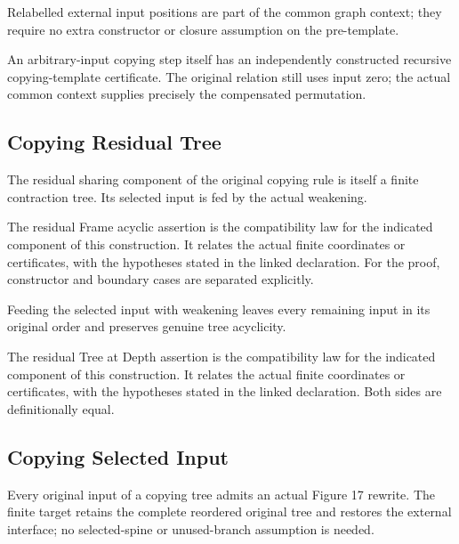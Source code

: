 Relabelled external input positions are part of the common graph context; they require no extra constructor or closure assumption on the pre-template.
\par{}

An arbitrary-input copying step itself has an independently constructed recursive copying-template certificate. The original relation still uses input zero; the actual common context supplies precisely the compensated permutation.
\par{}

\subsection{Copying Residual Tree}
The residual sharing component of the original copying rule is itself a finite contraction tree. Its selected input is fed by the actual weakening.

The residual Frame acyclic assertion is the compatibility law for the indicated component of this construction. It relates the actual finite coordinates or certificates, with the hypotheses stated in the linked declaration.
For the proof, constructor and boundary cases are separated explicitly.
\par{}

Feeding the selected input with weakening leaves every remaining input in its original order and preserves genuine tree acyclicity.
\par{}

The residual Tree at Depth assertion is the compatibility law for the indicated component of this construction. It relates the actual finite coordinates or certificates, with the hypotheses stated in the linked declaration.
Both sides are definitionally equal.
\par{}

\subsection{Copying Selected Input}
Every original input of a copying tree admits an actual Figure 17 rewrite. The finite target retains the complete reordered original tree and restores the external interface; no selected-spine or unused-branch assumption is needed.

